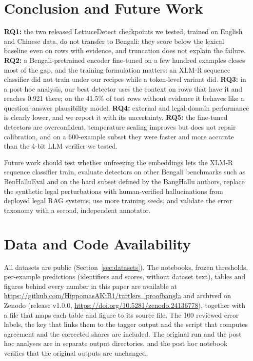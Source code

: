 \documentclass[manuscript,screen,review]{acmart}
\begin{document}
\section{Conclusion and Future Work}\label{sec:conclusion}
\textbf{RQ1:} the two released LettuceDetect checkpoints we tested, trained on English and Chinese data, do not transfer to Bengali: they score below the lexical baseline even on rows with evidence, and truncation does not explain the failure. \textbf{RQ2:} a Bengali-pretrained encoder fine-tuned on a few hundred examples closes most of the gap, and the training formulation matters: an XLM-R sequence classifier did not train under our recipes while a token-level variant did. \textbf{RQ3:} in a post hoc analysis, our best detector uses the context on rows that have it and reaches 0.921 there; on the 41.5\% of test rows without evidence it behaves like a question--answer plausibility model. \textbf{RQ4:} external and legal-domain performance is clearly lower, and we report it with its uncertainty. \textbf{RQ5:} the fine-tuned detectors are overconfident, temperature scaling improves but does not repair calibration, and on a 600-example subset they were faster and more accurate than the 4-bit LLM verifier we tested.

Future work should test whether unfreezing the embeddings lets the XLM-R sequence classifier train, evaluate detectors on other Bengali benchmarks such as BenHalluEval \cite{adib2026benhallueval} and on the hard subset defined by the BangHallu authors, replace the synthetic legal perturbations with human-verified hallucinations from deployed legal RAG systems, use more training seeds, and validate the error taxonomy with a second, independent annotator.

\section*{Data and Code Availability}
All datasets are public (Section~\ref{sec:datasets}). The notebooks, frozen thresholds, per-example predictions (identifiers and scores, without dataset text), tables and figures behind every number in this paper are available at \url{https://github.com/HippomasAKiB1/turtlers_proofbangla} and archived on Zenodo (release v1.0.0, \url{https://doi.org/10.5281/zenodo.24136778}), together with a file that maps each table and figure to its source file. The 100 reviewed error labels, the key that links them to the tagger output and the script that computes agreement and the corrected shares are included. The original run and the post hoc analyses are in separate output directories, and the post hoc notebook verifies that the original outputs are unchanged.
\end{document}
